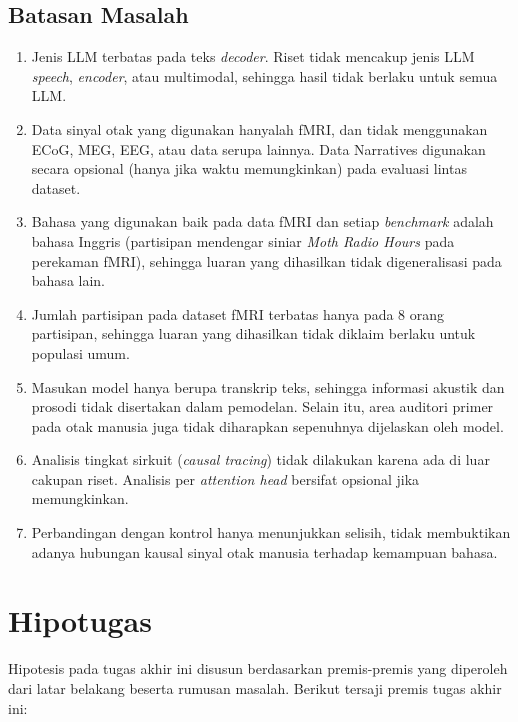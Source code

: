 \subsection*{Batasan Masalah}
\begin{enumerate}
    \item Jenis LLM terbatas pada teks \textit{decoder}. Riset tidak mencakup jenis LLM \textit{speech}, \textit{encoder}, atau multimodal, sehingga hasil tidak berlaku untuk semua LLM.
    \item Data sinyal otak yang digunakan hanyalah fMRI, dan tidak menggunakan ECoG, MEG, EEG, atau data serupa lainnya. Data Narratives digunakan secara opsional (hanya jika waktu memungkinkan) pada evaluasi lintas dataset.
    \item Bahasa yang digunakan baik pada data fMRI dan setiap \textit{benchmark} adalah bahasa Inggris (partisipan mendengar siniar \textit{Moth Radio Hours} pada perekaman fMRI), sehingga luaran yang dihasilkan tidak digeneralisasi pada bahasa lain.
    \item Jumlah partisipan pada dataset fMRI terbatas hanya pada 8 orang partisipan, sehingga luaran yang dihasilkan tidak diklaim berlaku untuk populasi umum.
    \item Masukan model hanya berupa transkrip teks, sehingga informasi akustik dan prosodi tidak disertakan dalam pemodelan. Selain itu, area auditori primer pada otak manusia juga tidak diharapkan sepenuhnya dijelaskan oleh model.
    \item Analisis tingkat sirkuit (\textit{causal tracing}) tidak dilakukan karena ada di luar cakupan riset. Analisis per \textit{attention head} bersifat opsional jika memungkinkan.
    \item Perbandingan dengan kontrol hanya menunjukkan selisih, tidak membuktikan adanya hubungan kausal sinyal otak manusia terhadap kemampuan bahasa.
\end{enumerate}

\section{Hipotugas}
\label{chap:pd_hipo}
Hipotesis pada tugas akhir ini disusun berdasarkan premis-premis yang diperoleh dari latar belakang beserta rumusan masalah. Berikut tersaji premis tugas akhir ini:

